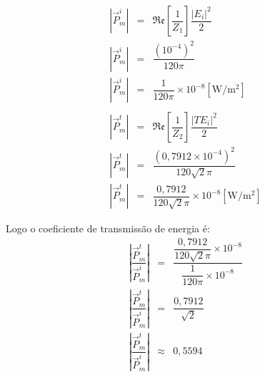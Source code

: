 \begin{enumerate}[1.]
\begin{eqnarray*}
|\vec{P}_{m}^{i}| & = & \mathfrak{Re}\left[\dfrac{1}{Z_{1}}\right] \dfrac{|E_{i}|^2}{2} \\
|\vec{P}_{m}^{i}| & = & \dfrac{(10^{-4})^{2}}{120\pi} \\
|\vec{P}_{m}^{i}| & = & \dfrac{1}{120\pi} \times 10^{-8} [\si{\watt/\meter^{2}}] \\
& & \\
|\vec{P}_{m}^{t}| & = & \mathfrak{Re}\left[\dfrac{1}{Z_{2}}\right] \dfrac{|T E_{i}|^2}{2} \\
|\vec{P}_{m}^{t}| & = & \dfrac{(0,7912 \times 10^{-4})^{2}}{120\sqrt{2}\pi} \\
|\vec{P}_{m}^{t}| & = & \dfrac{0,7912}{120\sqrt{2}\pi} \times 10^{-8} [\si{\watt/\meter^{2}}]
\end{eqnarray*}

Logo o coeficiente de transmissão de energia é:
\begin{eqnarray*}
\left|\dfrac{\vec{P}_{m}^{t}}{\vec{P}_{m}^{i}}\right| & = & \dfrac{\dfrac{0,7912}{120\sqrt{2}\pi} \times 10^{-8}}{\dfrac{1}{120\pi} \times 10^{-8}} \\
\left|\dfrac{\vec{P}_{m}^{t}}{\vec{P}_{m}^{i}}\right| & = & \dfrac{0,7912}{\sqrt{2}} \\
\left|\dfrac{\vec{P}_{m}^{t}}{\vec{P}_{m}^{i}}\right| & \approx & 0,5594
\end{eqnarray*}

\end{enumerate}
 

